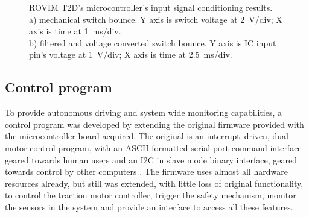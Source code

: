 \documentclass[journal]{IEEEtran}
\begin{document}
\begin{figure}
    \centering
        \hfill
        \caption[]{ROVIM T2D's microcontroller's input signal conditioning results.\\\hspace{\textwidth}a) mechanical switch bounce. Y axis is switch voltage at \SI{2}{\volt/div}; X axis is time at \SI{1}{\milli\second/div}.\\\hspace{\textwidth}b) filtered and voltage converted switch bounce. Y axis is IC input pin's voltage at \SI{1}{\volt/div}; X axis is time at \SI{2.5}{\milli\second/div}.}
        \label{fig:debouncer}
\end{figure}


\subsection{Control program}

To provide autonomous driving and system wide monitoring capabilities, a control program was developed by extending the original firmware provided with the microcontroller board acquired. The original is an interrupt--driven, dual motor control program, with an \ac{ASCII} formatted serial port command interface geared towards human users and an \ac{I2C} in slave mode binary interface, geared towards control by other computers \cite{dalf_om}. The firmware uses almost all hardware resources already, but still was extended, with little loss of original functionality, to control the traction motor controller, trigger the safety mechanism, monitor the sensors in the system and provide an interface to access all these features.
\end{document}
